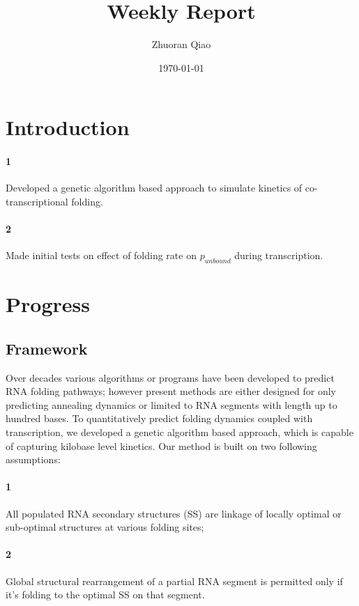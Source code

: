 \documentclass[11pt, a4paper]{article}
\begin{document}
\title{Weekly Report}
\author{Zhuoran Qiao}
\date{\today}

\maketitle

\section{Introduction}

\paragraph{1} Developed a genetic algorithm based approach to simulate kinetics of co-transcriptional folding.
\paragraph{2} Made initial tests on effect of folding rate on $p_{unbound}$ during transcription.


\section{Progress}
\subsection{Framework}
Over decades various algorithms or programs have been developed to predict RNA folding pathways; however present methods are either designed for only predicting
annealing dynamics or limited to RNA segments with length up to hundred bases. To quantitatively predict folding dynamics coupled with transcription,
we developed a genetic algorithm based approach, which is capable of capturing kilobase level kinetics.
 Our method is built on two following assumptions:
\paragraph{1} All populated RNA secondary structures (SS) are linkage of locally optimal or sub-optimal structures at various folding sites;
\paragraph{2} Global structural rearrangement of a partial RNA segment is permitted only if it's folding to the optimal SS on that segment.
\\
\end{document}
